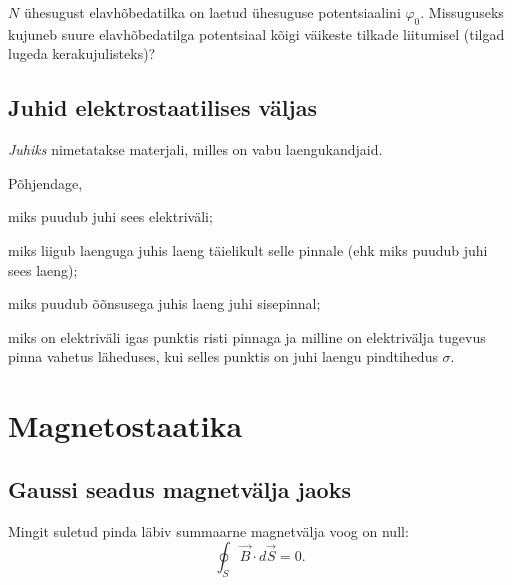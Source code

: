 \documentclass[a4paper,11pt,twocolumn]{article}
\begin{document}
\begin{question}
	\( N \) ühesugust elavhõbedatilka on laetud ühesuguse potentsiaalini \( \varphi_0 \). Missuguseks kujuneb suure elavhõbedatilga potentsiaal kõigi väikeste tilkade liitumisel (tilgad lugeda kerakujulisteks)?
\end{question}

\subsection{Juhid elektrostaatilises väljas}
\textit{Juhiks} nimetatakse materjali, milles on vabu laengukandjaid. 
\begin{question}
	Põhjendage,
	\begin{subquestion}
		\item miks puudub juhi sees elektriväli;
		\item miks liigub laenguga juhis laeng täielikult selle pinnale (ehk miks puudub juhi sees laeng);
		\item miks puudub õõnsusega juhis laeng juhi sisepinnal;
		\item miks on elektriväli igas punktis risti pinnaga ja milline on elektrivälja tugevus pinna vahetus läheduses, kui selles punktis on juhi laengu pindtihedus $\sigma$.
	\end{subquestion}
\end{question}




\section{Magnetostaatika}
\subsection{Gaussi seadus magnetvälja jaoks}
Mingit suletud pinda läbiv summaarne magnetvälja voog on null:
\begin{equation*}
\oint_S\vec{B}\cdot d\vec{S}=0 \tag{II Maxwelli võrrand}.
\end{equation*}
\end{document}

